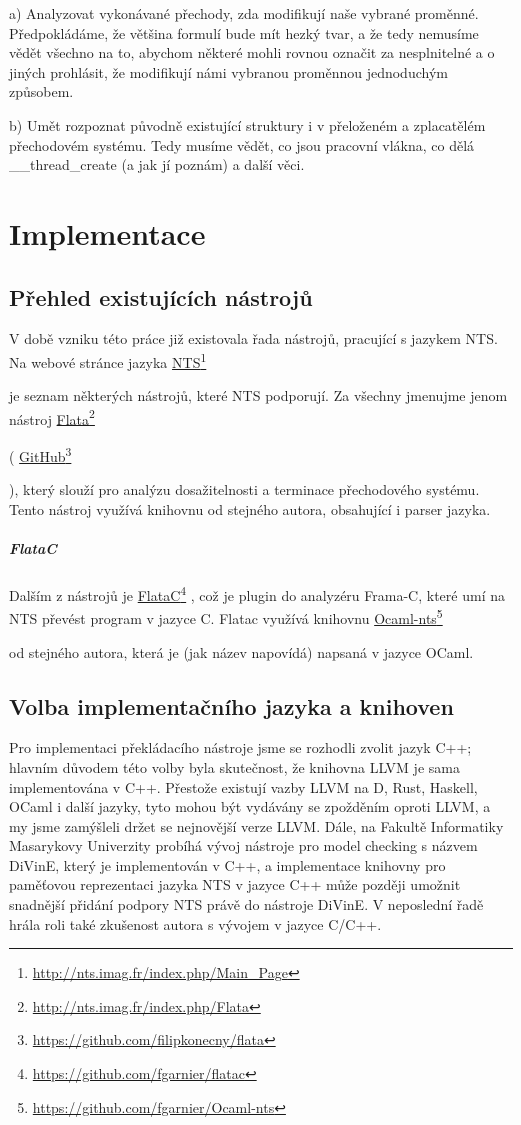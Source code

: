 \documentclass{fithesis2}
\newcommand\fnurl[2]{%
  \href{#2}{#1}\footnote{\url{#2}}%
}
\begin{document}
a) Analyzovat vykonávané přechody, zda modifikují naše vybrané proměnné. Předpokládáme, že většina formulí bude mít hezký tvar, a že tedy nemusíme vědět všechno na to, abychom některé mohli rovnou označit za nesplnitelné a o jiných prohlásit, že modifikují námi vybranou proměnnou jednoduchým způsobem.

b) Umět rozpoznat původně existující struktury i v přeloženém a zplacatělém přechodovém systému. Tedy musíme vědět, co jsou pracovní vlákna, co dělá \_\_thread\_create (a jak jí poznám) a další věci.


\chapter{Implementace}

\section{Přehled existujících nástrojů}
V době vzniku této práce již existovala řada nástrojů, pracující s jazykem NTS. Na webové stránce jazyka
\fnurl{NTS}{http://nts.imag.fr/index.php/Main_Page}
je seznam některých nástrojů, které NTS podporují. Za všechny jmenujme jenom nástroj
\fnurl{Flata}{http://nts.imag.fr/index.php/Flata}
(
\fnurl{GitHub}{https://github.com/filipkonecny/flata}
), který slouží pro analýzu dosažitelnosti a terminace přechodového systému. Tento nástroj využívá knihovnu od stejného autora, obsahující i parser jazyka.
\paragraph{FlataC}
Dalším z nástrojů je
\fnurl{FlataC}{https://github.com/fgarnier/flatac},
což je plugin do analyzéru Frama-C, které umí na NTS převést program v jazyce C.
Flatac využívá knihovnu
\fnurl{Ocaml-nts}{https://github.com/fgarnier/Ocaml-nts}
od stejného autora, která je (jak název napovídá) napsaná v jazyce OCaml.

\section{Volba implementačního jazyka a knihoven}
Pro implementaci překládacího nástroje jsme se rozhodli zvolit jazyk C++; hlavním důvodem této volby byla skutečnost, že knihovna LLVM je sama implementována v C++. Přestože existují vazby LLVM na D, Rust, Haskell, OCaml i další jazyky, tyto mohou být vydávány se zpožděním oproti LLVM, a my jsme zamýšleli držet se nejnovější verze LLVM. Dále, na Fakultě Informatiky Masarykovy Univerzity probíhá vývoj nástroje pro model checking s názvem DiVinE, který je implementován v C++, a implementace knihovny pro paměťovou reprezentaci jazyka NTS v jazyce C++ může později umožnit snadnější přidání podpory NTS právě do nástroje DiVinE\cite{BBH+13}. V neposlední řadě hrála roli také zkušenost autora s vývojem v jazyce C/C++.
\end{document}
